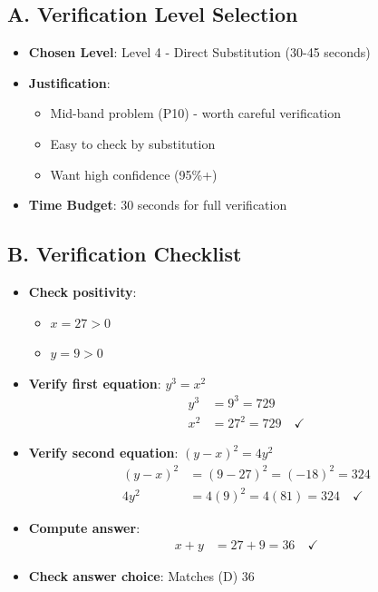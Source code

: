 \documentclass[12pt]{article}
\begin{document}
\begin{verificationbox}
\subsection*{A. Verification Level Selection}
\begin{itemize}[leftmargin=*]
    \item \textbf{Chosen Level}: Level 4 - Direct Substitution (30-45 seconds)
    \item \textbf{Justification}: 
    \begin{itemize}
        \item Mid-band problem (P10) - worth careful verification
        \item Easy to check by substitution
        \item Want high confidence (95\%+)
    \end{itemize}
    \item \textbf{Time Budget}: 30 seconds for full verification
\end{itemize}

\subsection*{B. Verification Checklist}
\begin{itemize}[leftmargin=*]
    \item \textbf{Check positivity}:
    \begin{itemize}
        \item $x = 27 > 0$ \checkmark
        \item $y = 9 > 0$ \checkmark
    \end{itemize}
    \item \textbf{Verify first equation}: $y^3 = x^2$
    \begin{align*}
    y^3 &= 9^3 = 729\\
    x^2 &= 27^2 = 729 \quad \checkmark
    \end{align*}
    \item \textbf{Verify second equation}: $(y-x)^2 = 4y^2$
    \begin{align*}
    (y-x)^2 &= (9-27)^2 = (-18)^2 = 324\\
    4y^2 &= 4(9)^2 = 4(81) = 324 \quad \checkmark
    \end{align*}
    \item \textbf{Compute answer}:
    \begin{align*}
    x + y &= 27 + 9 = 36 \quad \checkmark
    \end{align*}
    \item \textbf{Check answer choice}: Matches (D) 36 \checkmark
\end{itemize}


\end{verificationbox}
\end{document}
